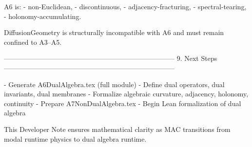A6 is:
- non-Euclidean,
- discontinuous,
- adjacency-fracturing,
- spectral-tearing,
- holonomy-accumulating.

DiffusionGeometry is structurally incompatible with A6 and must remain confined
to A3–A5.

---------------------------------------------------------------------------
9. Next Steps
---------------------------------------------------------------------------

- Generate A6DualAlgebra.tex (full module)
- Define dual operators, dual invariants, dual membranes
- Formalize algebraic curvature, adjacency, holonomy, continuity
- Prepare A7NonDualAlgebra.tex
- Begin Lean formalization of dual algebra

This Developer Note ensures mathematical clarity as MAC transitions from modal
runtime physics to dual algebra runtime.
